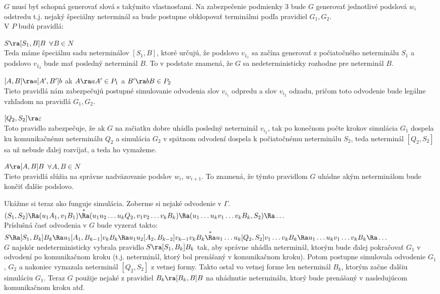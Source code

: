 \begin{dokaz}
$G$ musí byť schopná generovať slová s takýmito vlastnosťami. Na
zabezpečenie podmienky 3 bude $G$ generovať jednotlivé podslová
$w_i$ odstredu t.j. nejaký špeciálny neterminál sa bude postupne
obklopovať terminálmi podľa pravidiel $G_1,G_2$.
\\ V $P$ budú pravidlá:
\begin{description}
  \item{$S\ra [S_1,B] B$  $\forall B\in N$} \\Teda máme špeciálnu
  sadu neterminálov $[S_1,B]$, ktoré určujú, že podslovo $v_{1_1}$
  sa začína generovať z počiatočného neterminálu $S_1$ a podslovo
  $v_{1_2}$ bude mať posledný neterminál $B$. To v podstate znamená,
  že $G$ sa nedeterministicky rozhodne pre neterminál $B$.
  \item{$[A,B]\ra a[A',B']b$  ak $A\ra aA'\in P_1$ a $B'\ra bB\in
  P_2$} \\ Tieto pravidlá nám zabezpečujú postupné simulovanie
  odvodenia slov $v_{i_1}$ odpredu a slov $v_{i_2}$ odzadu, pričom
  toto odvodenie bude legálne vzhľadom na pravidlá $G_1,G_2$.
  \item{$[Q_2,S_2]\ra\varepsilon$} \\ Toto pravidlo zabezpečuje, že
  ak $G$ na začiatku dobre uhádla posledný neterminál $v_{i_2}$, tak
  po konečnom počte krokov simulácia $G_1$ dospela ku komunikačnému
  neterminálu $Q_2$ a simulácia $G_2$ v spätnom odvodení dospela k
  počiatočnému neterminálu $S_2$, teda neterminál $[Q_2,S_2]$ sa už
  nebude ďalej rozvíjať, a teda ho vymažeme.
  \item{$A\ra [A,B]B$  $\forall A,B\in N$} \\ Tieto pravidlá slúžia na
  správne nadväzovanie podslov $w_i$, $w_{i+1}$. To znamená, že
  týmto pravidlom $G$ uhádne akým neterminálom bude končiť ďalšie
  podslovo.
\end{description}
Ukážme si teraz ako funguje simulácia. Zoberme si nejaké odvodenie
v $\Gamma$.
\\ $(S_1,S_2)\Ra (u_1A_1,v_1B_1)\overset{*}\Ra (u_1u_2\dots u_kQ_2,v_1v_2\dots
v_kB_k)\Ra (u_1\dots u_kv_1\dots v_kB_k,S_2)\Ra\dots$
\\ Príslušná časť odvodenia v $G$ bude vyzerať takto:
\\ $S\Ra [S_1,B_k]B_k\Ra u_1[A_1,B_{k-1}]v_kB_k\Ra u_1u_2[A_2,B_{k-2}]v_{k-1}v_kB_k
\overset{*}\Ra\newline u_1\dots u_k[Q_2,S_2]v_1\dots v_kB_k\Ra
u_1\dots u_kv_1\dots v_kB_k\Ra\dots$
\\ $G$ najskôr nedeterministicky vybrala pravidlo $S\ra
[S_1,B_k]B_k$ tak, aby správne uhádla neterminál, ktorým bude
ďalej pokračovať $G_1$ v odvodení po komunikačnom kroku (t.j.
neterminál, ktorý bol prenášaný v komunikačnom kroku). Potom
postupne simulovala odvodenie $G_1$, $G_2$ a nakoniec vymazala
neterminál $[Q_2,S_2]$ z vetnej formy. Takto ostal vo vetnej forme
len neterminál $B_k$, ktorým začne ďalšiu simuláciu $G_1$. Teraz
$G$ použije nejaké z pravidiel $B_k\ra [B_k,B]B$ na uhádnutie
neterminálu, ktorý bude prenášaný v nasledujúcom komunikačnom
kroku atď.


\end{dokaz}
